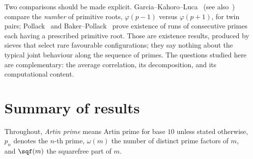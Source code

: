 Two comparisons should be made explicit. Garcia--Kahoro--Luca~\cite{GarciaKahoroLuca2019}
(see also~\cite{GarciaLucaShiUdell2020}) compare the \emph{number} of primitive roots,
$\varphi(p-1)$ versus $\varphi(p+1)$, for twin pairs; Pollack~\cite{Pollack2014} and
Baker--Pollack~\cite{BakerPollack2016} prove existence of runs of consecutive primes each
having a prescribed primitive root. Those are existence results, produced by sieves that
select rare favourable configurations; they say nothing about the typical joint behaviour
along the sequence of primes. The questions studied here are complementary: the average
correlation, its decomposition, and its computational content.

\section{Summary of results}
\label{sec:summary}

Throughout, \emph{Artin prime} means Artin prime for base $10$ unless stated otherwise,
$p_n$ denotes the $n$-th prime, $\omega(m)$ the number of distinct prime factors of $m$,
and $\sqf(m)$ the squarefree part of $m$.

